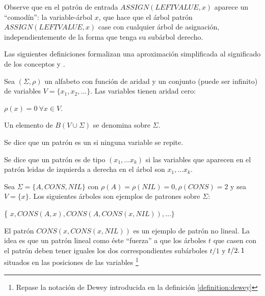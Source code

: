 Observe que en el patrón de entrada $ASSIGN(LEFTVALUE, x)$ aparece un
``comodín'': la variable-árbol $x$, que hace que el árbol
patrón $ASSIGN(LEFTVALUE, x)$ case con cualquier árbol de asignación,
independientemente de la forma que tenga su subárbol derecho.

Las siguientes definiciones formalizan una aproximación simplificada 
al significado de los conceptos  y
.

\begin{definition}
Sea $(\Sigma, \rho)$ un alfabeto con función de aridad
y un conjunto (puede ser infinito) 
de variables $V =\{ x_1, x_2, \ldots \}$. 
Las variables tienen
aridad cero: 

\begin{center}
$\rho(x) = 0\ \forall x \in V$. 
\end{center}

Un elemento de $B(V \cup \Sigma)$
se denomina  sobre $\Sigma$.
\end{definition}

\begin{definition}
Se dice que un
patrón es un  si ninguna variable se repite.
\end{definition}

\begin{definition}
Se dice que un patrón es de tipo $(x_1, \ldots x_k)$ si las variables
que aparecen en el patrón leidas de izquierda a derecha en el árbol
son $x_1, \ldots x_k$.
\end{definition}

\begin{example}
Sea $\Sigma = \{A, CONS, NIL \}$ con $\rho(A) = \rho(NIL) = 0, \rho(CONS) = 2$
y sea $V = \{ x \}$. Los siguientes árboles son ejemplos de 
patrones sobre $\Sigma$:

\begin{center}
\{ $x, CONS(A, x), CONS(A, CONS(x, NIL)), \ldots \}$
\end{center}

El patrón $CONS(x, CONS(x, NIL))$ es un ejemplo de patrón no lineal.
La idea es que un patrón lineal como éste ``fuerza'' a que los árboles $t$
que casen con el patrón deben tener iguales los dos correspondientes
subárboles $t/1$ y $t/2 \ldotp 1$ situados en las posiciones de las variables
\footnote{Repase la notación de Dewey introducida en 
la definición \ref{definition:dewey}}

\end{example}

